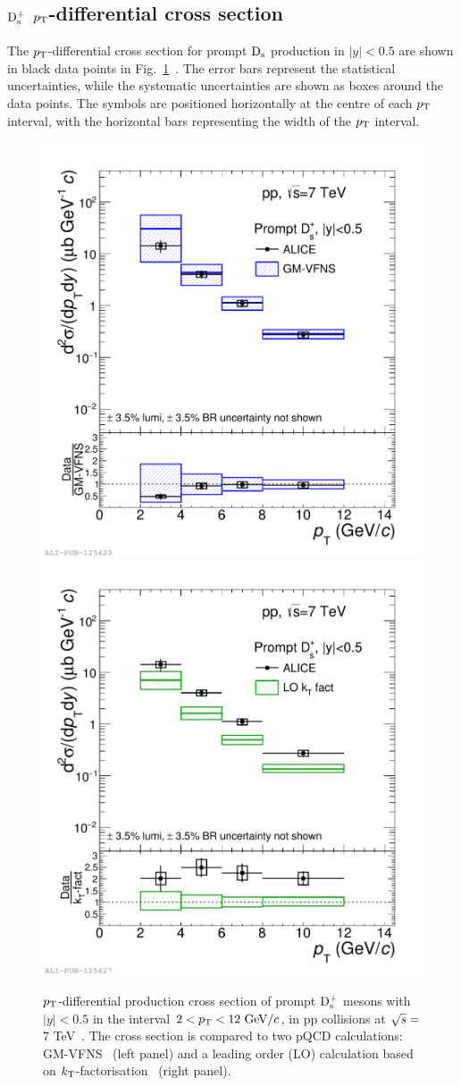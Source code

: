 \subsection{${\rm D_s^+}$ $p_{\rm T}$-differential cross section}
\label{sec:ppCrosSec}
The $p_{\rm T}$-differential cross section for prompt ${\rm D_s}$ 
production in $|y|<0.5$ are shown in black data points in 
Fig.~\ref{fig:CrossSecDsvsGMVFNS}~\cite{Acharya:2017jgo}.
The error bars represent the statistical uncertainties, while the systematic 
uncertainties are shown as boxes around the data points. 
The symbols are positioned horizontally at the centre of each $p_{\rm T}$ interval,
with the horizontal bars representing the width of the $p_{\rm T}$ interval. 
\begin{figure}[!b]
\begin{center}
\includegraphics[width=.48\textwidth]{FigCap4/DsppCrossSecVsGMVFNSAndRatio.pdf}
\includegraphics[width=.48\textwidth]{FigCap4/DsppCrossSecVsKtFactAndRatio.pdf}
\caption{$p_{\rm T}$-differential production cross section of prompt ${\rm D_s^+}$ mesons 
with $|y|<0.5$ in the interval \mbox{$2<p_{\rm T}<12~\mathrm{GeV}/c$}, in pp collisions at 
$\sqrt{s}  =$ 7 TeV~\cite{Acharya:2017jgo}. 
The cross section is compared to two pQCD calculations: 
GM-VFNS~\cite{Kniehl:2012ti} (left panel) and a leading order (LO) calculation 
based on $k_{\rm T}$-factorisation~\cite{Maciula:2013wg} (right panel).
}
\label{fig:CrossSecDsvsGMVFNS}
\end{center}
\end{figure}
